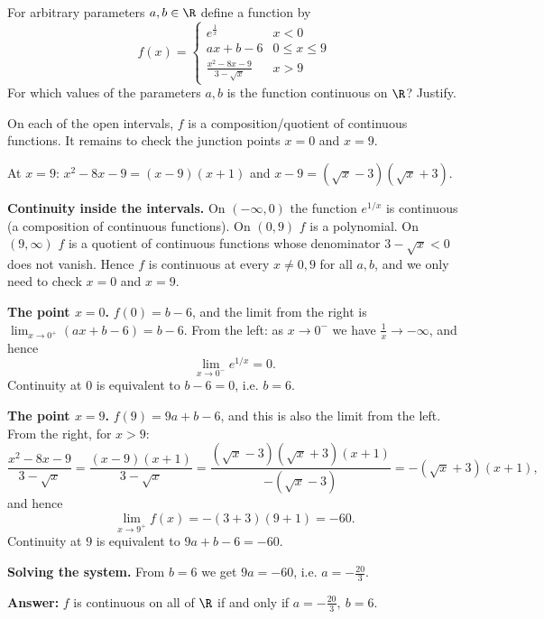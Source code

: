 
\begin{question}
For arbitrary parameters $a,b\in\R$ define a function by
\[ f(x)=\begin{cases} e^{\frac1x} & x<0\\ ax+b-6 & 0\le x\le 9\\ \frac{x^2-8x-9}{3-\sqrt{x}} & x>9 \end{cases} \]
For which values of the parameters $a,b$ is the function continuous on $\R$? Justify.
\end{question}

\begin{hint}
On each of the open intervals, $f$ is a composition/quotient of continuous functions. It remains to check the junction points $x=0$ and $x=9$.
\end{hint}

\begin{hint}
At $x=9$: $x^2-8x-9=(x-9)(x+1)$ and $x-9=(\sqrt x-3)(\sqrt x+3)$.
\end{hint}

\begin{solution}
\textbf{Continuity inside the intervals.} On $(-\infty,0)$ the function $e^{1/x}$ is continuous (a composition of continuous functions). On $(0,9)$ $f$ is a polynomial. On $(9,\infty)$ $f$ is a quotient of continuous functions whose denominator $3-\sqrt x<0$ does not vanish. Hence $f$ is continuous at every $x\neq0,9$ for all $a,b$, and we only need to check $x=0$ and $x=9$.

\textbf{The point $x=0$.} $f(0)=b-6$, and the limit from the right is $\lim_{x\to0^+}(ax+b-6)=b-6$. From the left: as $x\to0^-$ we have $\frac1x\to-\infty$, and hence
\[ \lim_{x\to0^-}e^{1/x}=0. \]
Continuity at $0$ is equivalent to $b-6=0$, i.e. $b=6$.

\textbf{The point $x=9$.} $f(9)=9a+b-6$, and this is also the limit from the left. From the right, for $x>9$:
\[ \frac{x^2-8x-9}{3-\sqrt x}=\frac{(x-9)(x+1)}{3-\sqrt x}=\frac{(\sqrt x-3)(\sqrt x+3)(x+1)}{-(\sqrt x-3)}=-(\sqrt x+3)(x+1), \]
and hence
\[ \lim_{x\to9^+}f(x)=-(3+3)(9+1)=-60. \]
Continuity at $9$ is equivalent to $9a+b-6=-60$.

\textbf{Solving the system.} From $b=6$ we get $9a=-60$, i.e. $a=-\frac{20}{3}$.

\textbf{Answer:} $f$ is continuous on all of $\R$ if and only if $\boxed{a=-\tfrac{20}{3},\ b=6}$.
\end{solution}
